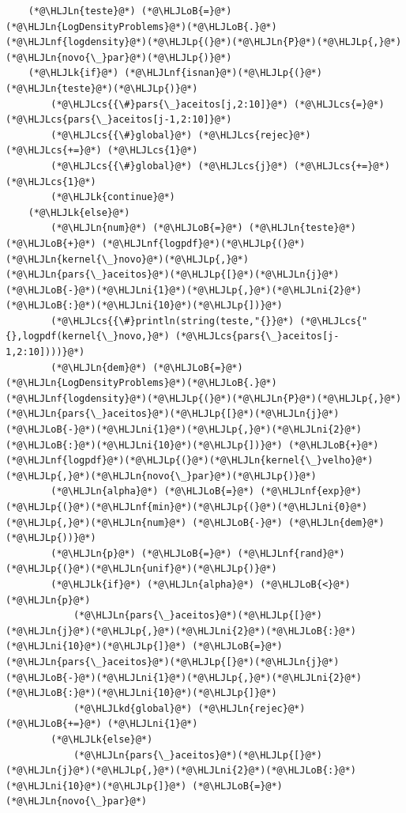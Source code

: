 \documentclass[12pt,a4paper]{article}
\newcommand{\HLJLk}[1]{\textcolor[RGB]{148,91,176}{\textbf{#1}}}
\newcommand{\HLJLkd}[1]{\textcolor[RGB]{214,102,97}{\textit{#1}}}
\newcommand{\HLJLn}[1]{#1}
\newcommand{\HLJLnf}[1]{\textcolor[RGB]{66,102,213}{#1}}
\newcommand{\HLJLni}[1]{\textcolor[RGB]{59,151,46}{#1}}
\newcommand{\HLJLoB}[1]{\textcolor[RGB]{102,102,102}{\textbf{#1}}}
\newcommand{\HLJLp}[1]{#1}
\newcommand{\HLJLcs}[1]{\textcolor[RGB]{153,153,119}{\textit{#1}}}
\begin{document}
\begin{lstlisting}
    (*@\HLJLn{teste}@*) (*@\HLJLoB{=}@*) (*@\HLJLn{LogDensityProblems}@*)(*@\HLJLoB{.}@*)(*@\HLJLnf{logdensity}@*)(*@\HLJLp{(}@*)(*@\HLJLn{P}@*)(*@\HLJLp{,}@*)(*@\HLJLn{novo{\_}par}@*)(*@\HLJLp{)}@*)
    (*@\HLJLk{if}@*) (*@\HLJLnf{isnan}@*)(*@\HLJLp{(}@*)(*@\HLJLn{teste}@*)(*@\HLJLp{)}@*)
        (*@\HLJLcs{{\#}pars{\_}aceitos[j,2:10]}@*) (*@\HLJLcs{=}@*) (*@\HLJLcs{pars{\_}aceitos[j-1,2:10]}@*)
        (*@\HLJLcs{{\#}global}@*) (*@\HLJLcs{rejec}@*) (*@\HLJLcs{+=}@*) (*@\HLJLcs{1}@*)
        (*@\HLJLcs{{\#}global}@*) (*@\HLJLcs{j}@*) (*@\HLJLcs{+=}@*) (*@\HLJLcs{1}@*)
        (*@\HLJLk{continue}@*)
    (*@\HLJLk{else}@*)
        (*@\HLJLn{num}@*) (*@\HLJLoB{=}@*) (*@\HLJLn{teste}@*) (*@\HLJLoB{+}@*) (*@\HLJLnf{logpdf}@*)(*@\HLJLp{(}@*)(*@\HLJLn{kernel{\_}novo}@*)(*@\HLJLp{,}@*)(*@\HLJLn{pars{\_}aceitos}@*)(*@\HLJLp{[}@*)(*@\HLJLn{j}@*)(*@\HLJLoB{-}@*)(*@\HLJLni{1}@*)(*@\HLJLp{,}@*)(*@\HLJLni{2}@*)(*@\HLJLoB{:}@*)(*@\HLJLni{10}@*)(*@\HLJLp{])}@*)
        (*@\HLJLcs{{\#}println(string(teste,"{}}@*) (*@\HLJLcs{"{},logpdf(kernel{\_}novo,}@*) (*@\HLJLcs{pars{\_}aceitos[j-1,2:10])))}@*)
        (*@\HLJLn{dem}@*) (*@\HLJLoB{=}@*) (*@\HLJLn{LogDensityProblems}@*)(*@\HLJLoB{.}@*)(*@\HLJLnf{logdensity}@*)(*@\HLJLp{(}@*)(*@\HLJLn{P}@*)(*@\HLJLp{,}@*)(*@\HLJLn{pars{\_}aceitos}@*)(*@\HLJLp{[}@*)(*@\HLJLn{j}@*)(*@\HLJLoB{-}@*)(*@\HLJLni{1}@*)(*@\HLJLp{,}@*)(*@\HLJLni{2}@*)(*@\HLJLoB{:}@*)(*@\HLJLni{10}@*)(*@\HLJLp{])}@*) (*@\HLJLoB{+}@*) (*@\HLJLnf{logpdf}@*)(*@\HLJLp{(}@*)(*@\HLJLn{kernel{\_}velho}@*)(*@\HLJLp{,}@*)(*@\HLJLn{novo{\_}par}@*)(*@\HLJLp{)}@*)
        (*@\HLJLn{alpha}@*) (*@\HLJLoB{=}@*) (*@\HLJLnf{exp}@*)(*@\HLJLp{(}@*)(*@\HLJLnf{min}@*)(*@\HLJLp{(}@*)(*@\HLJLni{0}@*)(*@\HLJLp{,}@*)(*@\HLJLn{num}@*) (*@\HLJLoB{-}@*) (*@\HLJLn{dem}@*)(*@\HLJLp{))}@*)
        (*@\HLJLn{p}@*) (*@\HLJLoB{=}@*) (*@\HLJLnf{rand}@*)(*@\HLJLp{(}@*)(*@\HLJLn{unif}@*)(*@\HLJLp{)}@*)
        (*@\HLJLk{if}@*) (*@\HLJLn{alpha}@*) (*@\HLJLoB{<}@*) (*@\HLJLn{p}@*)
            (*@\HLJLn{pars{\_}aceitos}@*)(*@\HLJLp{[}@*)(*@\HLJLn{j}@*)(*@\HLJLp{,}@*)(*@\HLJLni{2}@*)(*@\HLJLoB{:}@*)(*@\HLJLni{10}@*)(*@\HLJLp{]}@*) (*@\HLJLoB{=}@*) (*@\HLJLn{pars{\_}aceitos}@*)(*@\HLJLp{[}@*)(*@\HLJLn{j}@*)(*@\HLJLoB{-}@*)(*@\HLJLni{1}@*)(*@\HLJLp{,}@*)(*@\HLJLni{2}@*)(*@\HLJLoB{:}@*)(*@\HLJLni{10}@*)(*@\HLJLp{]}@*)
            (*@\HLJLkd{global}@*) (*@\HLJLn{rejec}@*) (*@\HLJLoB{+=}@*) (*@\HLJLni{1}@*)
        (*@\HLJLk{else}@*)
            (*@\HLJLn{pars{\_}aceitos}@*)(*@\HLJLp{[}@*)(*@\HLJLn{j}@*)(*@\HLJLp{,}@*)(*@\HLJLni{2}@*)(*@\HLJLoB{:}@*)(*@\HLJLni{10}@*)(*@\HLJLp{]}@*) (*@\HLJLoB{=}@*) (*@\HLJLn{novo{\_}par}@*)

\end{lstlisting}
\end{document}
